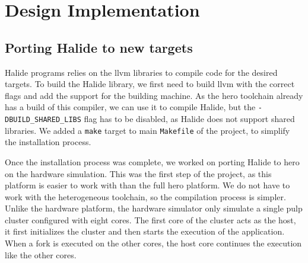 
\chapter{Design Implementation}


\section { Porting Halide to new targets}
    Halide programs relies on the \gls{llvm} libraries to compile code for the desired targets. To build the Halide library, we first need to build \gls{llvm} with the correct flags and add the support for the building machine.
    As the \gls{hero} toolchain already has a build of this compiler, we can use it to compile Halide, but the \texttt{-DBUILD\_SHARED\_LIBS} flag has to be disabled, as Halide does not support shared libraries.
    We added a \texttt{make} target to main \texttt{Makefile} of the project, to simplify the installation process.

    Once the installation process was complete, we worked on porting Halide to \gls{hero} on the hardware simulation. This was the first step of the project, as this platform is easier to work with than the full \gls{hero} platform. We do not have to work with the heterogeneous toolchain, so the compilation process is simpler.
    Unlike the hardware platform, the hardware simulator only simulate a single  \gls{pulp} cluster configured with eight cores.
    The first core of the cluster acts as the host, it first initializes the cluster and then starts the execution of the application.
     When a fork is executed on the other cores, the host core continues the execution like the other cores.
     

